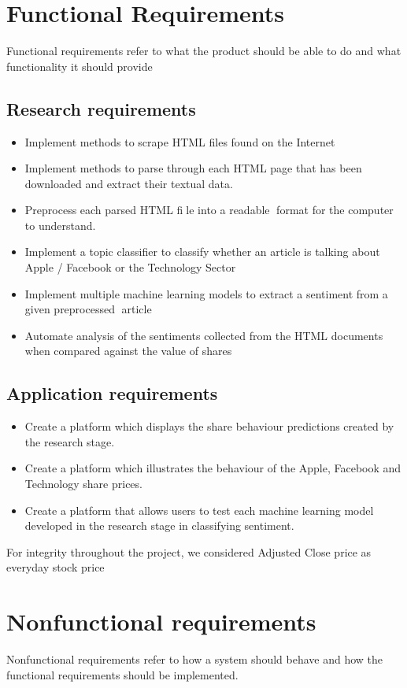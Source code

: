 \documentclass[a4paper,11pt]{report}
\begin{document}
\section{Functional Requirements}

Functional requirements refer to what the product should be able to do and what functionality it should provide

\subsection {Research requirements}
\begin{itemize}
  \item Implement methods to scrape HTML files found on the Internet
  \item Implement methods to parse through each HTML page that has been downloaded and extract their textual data.
	\item Preprocess each parsed HTML file into a readable format for the computer to understand.
	\item Implement a topic classifier to classify whether an article is talking about Apple / Facebook or the Technology Sector
	\item Implement multiple machine learning models to extract a sentiment from a given preprocessed article
	\item Automate analysis of the sentiments collected from the HTML documents when compared against the value of shares
\end{itemize}

\subsection {Application requirements}
\begin{itemize}
  \item Create a platform which displays the share behaviour predictions created by the research stage.
	\item Create a platform which illustrates the behaviour of the Apple, Facebook and Technology share prices.
	\item Create a platform that allows users to test each machine learning model developed in the research stage in classifying sentiment.
\end{itemize}

For integrity throughout the project, we considered
Adjusted Close price as everyday stock price

\section{Nonfunctional requirements}
Nonfunctional requirements refer to how a system should behave and how the functional requirements should be implemented.
\end{document}
